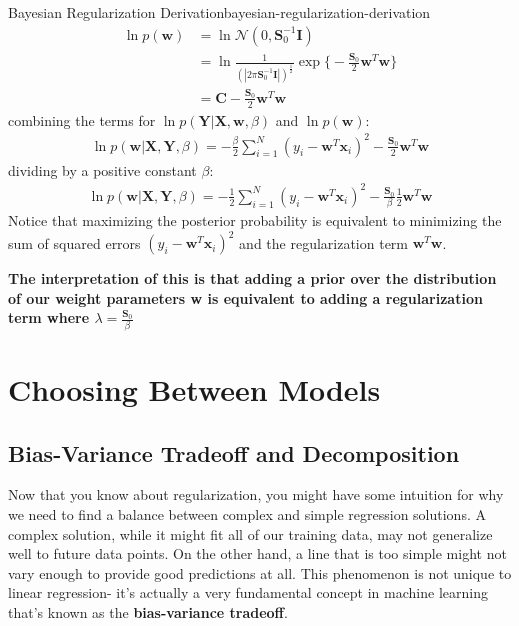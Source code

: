 \begin{derivation}{Bayesian Regularization Derivation}{bayesian-regularization-derivation}
    \begin{align*}
        \ln{p(\textbf{w})} &= \ln{\mathcal{N}(0, \boldsymbol{S}_{0}^{-1}\textbf{I})} \\
        &= \ln{\frac{1}{(|2\pi\boldsymbol{S}_{0}^{-1}\textbf{I}|)^{\frac{1}{2}}} \exp{\bigg\{-\frac{\boldsymbol{S}_{0}}{2} \textbf{w}^{T}\textbf{w}\bigg\}}} \\
        &= \textbf{C} -\frac{\boldsymbol{S}_{0}}{2} \textbf{w}^{T}\textbf{w}
    \end{align*}
    combining the terms for $\ln{p(\textbf{Y}| \textbf{X}, \textbf{w}, \beta)}$ and $\ln{p(\textbf{w})}$:
    \begin{align*}
        \ln{p(\textbf{w}|\textbf{X},\textbf{Y}, \beta)} = -\frac{\beta}{2}\sum_{i=1}^{N} (y_{i} - \textbf{w}^{T} \textbf{x}_{i})^2 - \frac{\boldsymbol{S}_{0}}{2} \textbf{w}^{T}\textbf{w}
    \end{align*}
    dividing by a positive constant $\beta$:
    \begin{align*}
        \ln{p(\textbf{w}|\textbf{X},\textbf{Y}, \beta)} = -\frac{1}{2}\sum_{i=1}^{N} (y_{i} - \textbf{w}^{T} \textbf{x}_{i})^2 - \frac{\boldsymbol{S}_{0}}{\beta}\frac{1}{2} \textbf{w}^{T}\textbf{w}
    \end{align*}
    Notice that maximizing the posterior probability is equivalent to minimizing the sum of squared errors $(y_{i} - \textbf{w}^{T} \textbf{x}_{i})^2$ and the regularization term $\textbf{w}^{T}\textbf{w}$.
\end{derivation}

\textbf{The interpretation of this is that adding a prior over the distribution of our weight parameters \textbf{w} is equivalent to adding a regularization term where $\lambda = \frac{\boldsymbol{S}_{0}}{\beta}$}

\section{Choosing Between Models}
\subsection{Bias-Variance Tradeoff and Decomposition}
Now that you know about regularization, you might have some intuition for why we need to find a balance between complex and simple regression solutions. A complex solution, while it might fit all of our training data, may not generalize well to future data points. On the other hand, a line that is too simple might not vary enough to provide good predictions at all. This phenomenon is not unique to linear regression- it's actually a very fundamental concept in machine learning that's known as the \textbf{bias-variance tradeoff}.

